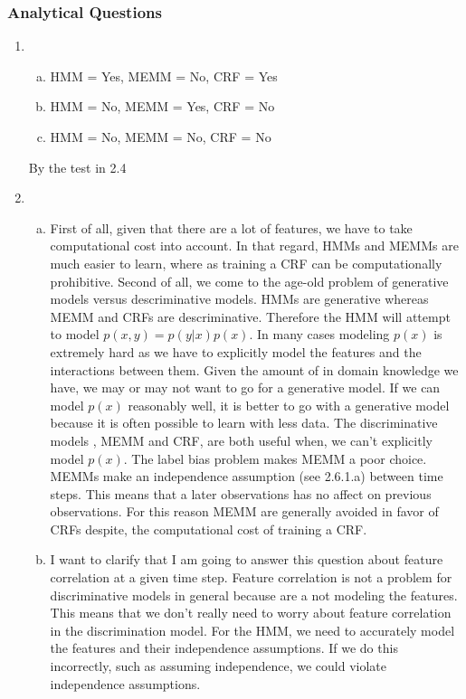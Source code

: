 \documentclass[12pt]{article}
\begin{document}
\subsubsection{Analytical Questions}

\begin{enumerate}[1.]
	\item 
		\begin{enumerate}[(a)]
			\item HMM = Yes, MEMM = No, CRF = Yes
			\item HMM = No, MEMM = Yes, CRF = No
			\item HMM = No, MEMM = No, CRF = No
		\end{enumerate}
		By the test in 2.4
	\item \begin{enumerate}[(a)]
		\item
				First of all, given that there are a lot of features, we have to take computational cost into account. In that regard, HMMs and MEMMs are much easier to learn, where as training a CRF can be computationally prohibitive. Second of all, we come to the age-old problem of generative models versus descriminative models. HMMs are generative whereas MEMM and CRFs are descriminative. Therefore the HMM will attempt to model $p(x,y) = p(y|x)p(x)$. In many cases modeling $p(x)$ is extremely hard as we have to explicitly model the features and the interactions between them. Given the amount of in domain knowledge we have, we may or may not want to go for a generative model. If we can model $p(x)$ reasonably well, it is  better to go with a generative model because it is often   possible to learn with less data. The discriminative models , MEMM and CRF, are both useful when, we can't explicitly model $p(x)$. The label bias problem makes  MEMM a poor choice.  MEMMs make an independence assumption (see 2.6.1.a) between time steps. This means that a later observations has no affect on previous observations. For this reason MEMM are generally avoided in favor of CRFs despite, the computational cost of training a CRF.	
				\item I want to clarify that I am going to answer this question about feature correlation at a given time step. Feature correlation is not a problem for discriminative models in general because are a not modeling the features. This means that we don't really need to worry about feature correlation in the discrimination model. For the HMM, we need to accurately model the features and their independence assumptions. If we do this incorrectly, such as assuming independence, we could violate independence assumptions. 
	\end{enumerate}
\end{enumerate}
\end{document}
